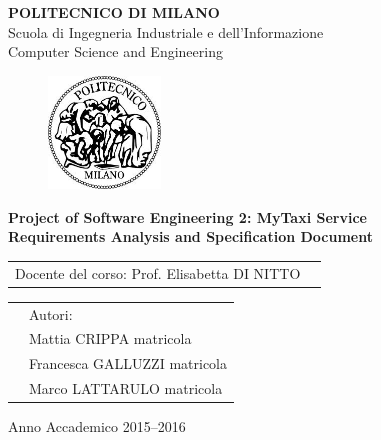 \documentclass[a4paper, 12pt]{report}
\begin{document}
\begin{titlepage}

\begin{center}
\Large
\textbf{POLITECNICO DI MILANO} \\
\Large
Scuola di Ingegneria Industriale e dell'Informazione \\
Computer Science and Engineering
\end{center}

\addvspace{0.8cm}
\begin{figure}[h]
\begin{center}
\includegraphics[width=3cm]{cpt/img/polimi}
\end{center}
\end{figure}

\addvspace{0.1cm}
\begin{center}
\LARGE

\textbf{Project of Software Engineering 2: MyTaxi Service \\
Requirements Analysis and Specification Document}

\end{center}

\addvspace{0.5cm}
\Large
\begin{center}
\begin{tabular}{p{}p{}}
Docente del corso: Prof. Elisabetta DI NITTO \\
\end{tabular}
\end{center}

\addvspace{0.7cm}
\Large
\begin{center}
\begin{tabular}{p{}p{}}
& Autori: \\
& Mattia CRIPPA     matricola\\
& Francesca GALLUZZI     matricola\\
& Marco LATTARULO     matricola
\end{tabular}
\end{center}

\vfill
\Large
\begin{center}
Anno Accademico 2015--2016
\end{center}
\end{titlepage}
\end{document}
